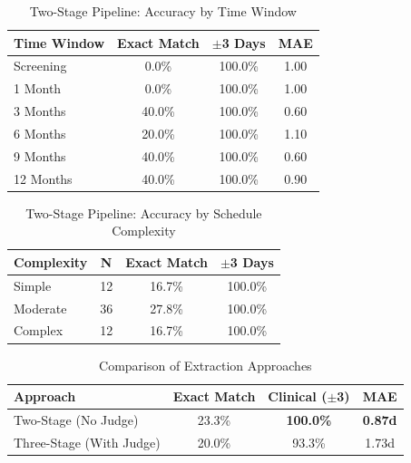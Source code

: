 \begin{table}[htbp]
\centering
\caption{Two-Stage Pipeline: Accuracy by Time Window}
\label{tab:two_stage_windows}
\begin{tabular}{lccc}
\toprule
\textbf{Time Window} & \textbf{Exact Match} & \textbf{$\pm$3 Days} & \textbf{MAE} \\
\midrule
Screening & 0.0\% & 100.0\% & 1.00 \\
1 Month & 0.0\% & 100.0\% & 1.00 \\
3 Months & 40.0\% & 100.0\% & 0.60 \\
6 Months & 20.0\% & 100.0\% & 1.10 \\
9 Months & 40.0\% & 100.0\% & 0.60 \\
12 Months & 40.0\% & 100.0\% & 0.90 \\
\bottomrule
\end{tabular}
\end{table}

\begin{table}[htbp]
\centering
\caption{Two-Stage Pipeline: Accuracy by Schedule Complexity}
\label{tab:two_stage_complexity}
\begin{tabular}{lccc}
\toprule
\textbf{Complexity} & \textbf{N} & \textbf{Exact Match} & \textbf{$\pm$3 Days} \\
\midrule
Simple & 12 & 16.7\% & 100.0\% \\
Moderate & 36 & 27.8\% & 100.0\% \\
Complex & 12 & 16.7\% & 100.0\% \\
\bottomrule
\end{tabular}
\end{table}


\begin{table}[htbp]
\centering
\caption{Comparison of Extraction Approaches}
\label{tab:approach_comparison}
\begin{tabular}{lccc}
\toprule
\textbf{Approach} & \textbf{Exact Match} & \textbf{Clinical ($\pm$3)} & \textbf{MAE} \\
\midrule
Two-Stage (No Judge) & 23.3\% & \textbf{100.0\%} & \textbf{0.87d} \\
Three-Stage (With Judge) & 20.0\% & 93.3\% & 1.73d \\
\bottomrule
\end{tabular}
\end{table}

